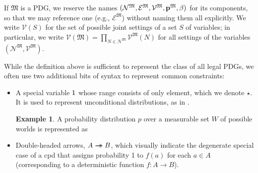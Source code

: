 \documentclass{article}
\theoremstyle{plain}
\theoremstyle{definition}
\newtheorem{examplex}{Example}
\theoremstyle{remark}
\newcommand{\tto}{%
	\rightarrow\mathrel{\mspace{-15mu}}\rightarrow}
\newcommand{\V}{\mathcal V}
\newcommand{\N}{\mathcal N}
\newcommand{\Ed}{\mathcal E}
\newcommand{\dg}[1]{\mathfrak{#1}}
\newcommand{\MN}{PDG}
\newcommand{\MNs}{\MN s}
\numberwithin{equation}{section}
\begin{document}
	If $\dg M$ is a \MN, we reserve the names $\mnvars[^\dg M]$ for its components, so that we may reference one (e.g., $\Ed^\dg M$) without naming them all explicitly.
	We write $\V(S)$ for the set of possible joint settings of a set $S$
        of variables; in particular, 
	we write $\V(\dg M)
		= \prod_{N \in \N^\dg M} \V^\dg M(N)$
	 for all settings of the variables $(\N^\dg M, \V^\dg M)$.
	

	While the definition above is sufficient to represent the class of all legal \MNs,
	we often use two additional bits of syntax to represent common constraints:  
	\begin{itemize}
	\item A special variable $\sf 1$ 
whose range consists of only element, which we denote $\star$.
It is used to represent
          unconditional distributions, as in
                  .  
	\begin{vleftovers}
		\begin{examplex}\label{ex:worldsonly}
			A probability distribution $p$ over a measurable set $W$ of possible worlds is represented as 
			\begin{center}
			\end{center}
		\end{examplex}
	\end{vleftovers}
		\item Double-headed arrows, $A \tto
                  B$, which visually indicate the degenerate special
                  case of a cpd that assigns probability 1 to $f(a)$
                  for each $a \in A$ (corresponding to a deterministic
                  function $f : A \to B$). 
	\end{itemize}
\end{document}
